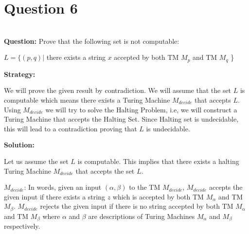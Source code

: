\documentclass[12pt,a4paper]{article}
\begin{document}
\section{Question 6}



\\
\textbf{Question:} Prove that the following set is not computable:
\begin{center}
    $L= \{(p,q) |$ there exists a string $x$ accepted by both TM $M_p$ and TM $M_q$ \}
    
\end{center}

\textbf{Strategy:} 


We will prove the given result by contradiction. We will assume that the set $L$ is computable which means there exists a Turing Machine $M_{decide}$ that accepts $L$. Using $M_{decide}$ we will try to solve the Halting Problem, i.e, we will construct a Turing Machine that accepts the Halting Set. Since Halting set is undecidable, this will lead to a contradiction proving that $L$ is undecidable.

\textbf{Solution:}

Let us assume the set $L$ is computable. This implies that there exists a halting Turing Machine $M_{decide}$ that accepts the set $L$.

\textbf{$M_{decide}$}: In words, given an input $(\alpha,\beta)$ to the TM $M_{decide}$, $M_{decide}$ accepts the given input if there exists a string $z$ which is accepted by both TM $M_{\alpha}$ and TM $M_{\beta}$. $M_{decide}$ rejects the given input if there is no string accepted by both TM $M_{\alpha}$ and TM $M_{\beta}$ where $\alpha$ and $\beta$ are descriptions of Turing Machines $M_{\alpha}$ and $M_{\beta}$ respectively.
\end{document}
